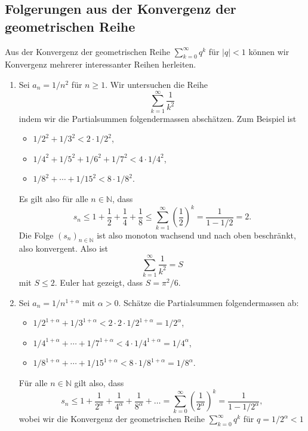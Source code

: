 \documentclass[../main.tex]{subfiles}
\begin{document}
\subsection*{Folgerungen aus der Konvergenz der
geometrischen Reihe}
Aus der Konvergenz der geometrischen Reihe
$\sum_{k=0}^{\infty} q^k$ für $|q|<1$
können wir Konvergenz mehrerer interessanter
Reihen herleiten.
\begin{enumerate}[(1)]
  \item Sei $a_n = 1/n^2$ für $n \geq 1$. Wir untersuchen die Reihe
    \[
      \sum_{k=1}^{\infty} \frac{1}{k^2}
    \]
    indem wir die Partialsummen folgendermassen abschätzen.
    Zum Beispiel ist
    \begin{itemize}
      \item $1/2^2 + 1/3^2 < 2 \cdot 1/2^2$,
      \item $1/4^2 + 1/5^2 + 1/6^2 + 1/7^2 < 4 \cdot 1/4^2$,
      \item $1/8^2 + \cdots + 1/15^2 < 8 \cdot 1/8^2$.
    \end{itemize}
    Es gilt also für alle $n \in \mathbb{N}$, dass
    \[
      s_n \leq 1 + \frac{1}{2} + \frac{1}{4} + \frac{1}{8}
      \leq \sum_{k=1}^{\infty} {\left( \frac{1}{2} \right)}^k
      = \frac{1}{1-1/2} = 2.
    \]
    Die Folge ${(s_{n})}_{n \in \mathbb{N}}$ ist also
    monoton wachsend und nach oben beschränkt, also
    konvergent. Also ist
    \[
      \sum_{k=1}^{\infty} \frac{1}{k^2} = S
    \]
    mit $S \leq 2$. Euler hat gezeigt, dass $S = \pi^2/6$.
  \item Sei $a_n = 1/n^{1 + \alpha}$ mit $\alpha > 0$.
    Schätze die Partialsummen folgendermassen ab:
    \begin{itemize}
      \item $1/2^{1 + \alpha} + 
        1/3^{1 + \alpha}< 2 \cdot 2 \cdot 1/2^{1+\alpha}
        = 1/2^\alpha$,
      \item $1/4^{1 + \alpha} + \cdots + 1/7^{1+ \alpha}
        < 4 \cdot 1/4^{1 + \alpha} = 1/4^\alpha$,
      \item $1/8^{1 + \alpha} + \cdots + 1/15^{1 + \alpha}
        < 8 \cdot 1 /8^{1 + \alpha} = 1/8^{\alpha}$.
    \end{itemize}
    Für alle $n \in \mathbb{N}$ gilt also, dass
    \[
      s_n \leq 1 + \frac{1}{2^{\alpha}} + \frac{1}{4^{\alpha}}
      + \frac{1}{8^{\alpha}} + \dots
      = \sum_{k=0}^{\infty} 
      {\left( \frac{1}{2^{\alpha}} \right)}^k
      = \frac{1}{1-1/2^{\alpha}},
    \]
    wobei wir die Konvergenz der geometrischen Reihe
    $\sum_{k=0}^{\infty} q^k$ für $q = 1/2^\alpha < 1$

\end{enumerate}
\end{document}
